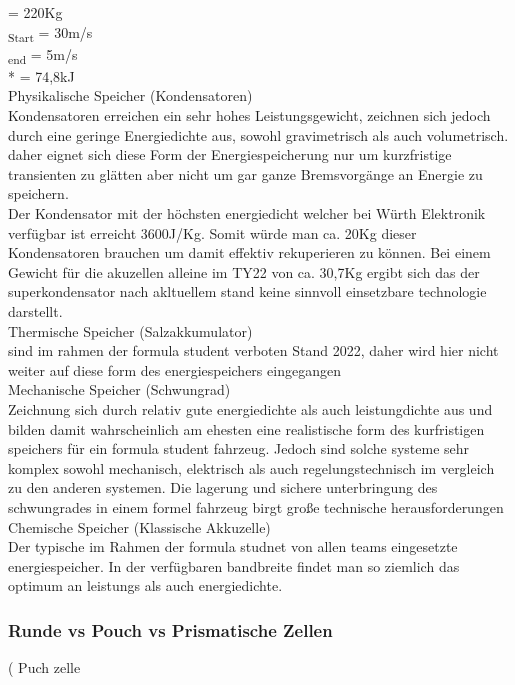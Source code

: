  = 220Kg
\\
\textsubscript{Start} = 30m/s
\\
\textsubscript{end} = 5m/s
\\
 *  = 74,8kJ
\\

Physikalische Speicher (Kondensatoren)
\\
	Kondensatoren erreichen ein sehr hohes Leistungsgewicht, zeichnen sich jedoch durch eine geringe Energiedichte aus, sowohl gravimetrisch als auch volumetrisch. daher eignet sich diese Form der Energiespeicherung nur um kurzfristige transienten zu glätten aber nicht um gar ganze Bremsvorgänge an Energie zu speichern.\\
	Der Kondensator mit der höchsten energiedicht welcher bei Würth Elektronik verfügbar ist erreicht 3600J/Kg. Somit würde man ca. 20Kg dieser Kondensatoren brauchen um damit effektiv rekuperieren zu können. Bei einem Gewicht für die akuzellen alleine im TY22 von ca. 30,7Kg ergibt sich das der superkondensator nach akltuellem stand keine sinnvoll einsetzbare technologie darstellt.
\\
Thermische Speicher (Salzakkumulator)
\\
	sind im rahmen der formula student verboten Stand 2022, daher wird hier nicht weiter auf diese form des energiespeichers eingegangen
\\
Mechanische Speicher (Schwungrad)
\\
	Zeichnung sich durch relativ gute energiedichte als auch leistungdichte aus und bilden damit wahrscheinlich am ehesten eine realistische form des kurfristigen speichers für ein formula student fahrzeug. Jedoch sind solche systeme sehr komplex sowohl mechanisch, elektrisch als auch regelungstechnisch im vergleich zu den anderen systemen. Die lagerung und sichere unterbringung des schwungrades in einem formel fahrzeug birgt große technische herausforderungen
\\
Chemische Speicher (Klassische Akkuzelle)
\\
	Der typische im Rahmen der formula studnet von allen teams eingesetzte energiespeicher. In der verfügbaren bandbreite findet man so ziemlich das optimum an leistungs als auch energiedichte.

\subsubsection{Runde vs Pouch vs Prismatische Zellen}
(
	Puch zelle

